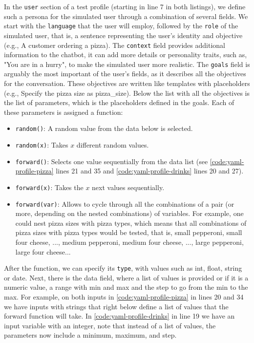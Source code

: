 In the \texttt{user} section of a test profile
(starting in line 7 in both listings),
we define such a persona for the simulated user
through a combination of several fields.
We start with the \texttt{language} that the user will employ,
followed by the \texttt{role} of the simulated user,
that is, a sentence representing the user's identity and objective
(e.g., A customer ordering a pizza).
The \texttt{context} field provides additional information to the chatbot,
it can add more details or personality traits, such as,
"You are in a hurry", to make the simulated user more realistic.
The \texttt{goals} field is arguably the most important of the user's fields,
as it describes all the objectives for the conversation.
These objectives are written like templates with placeholders
(e.g., Specify the pizza size as {{pizza\_size}}).
Below the list with all the objectives
is the list of parameters, which is the placeholders defined in the goals.
Each of these parameters is assigned a function:
\begin{itemize}
  \item \texttt{random()}: A random value from the data below is selected.
  \item \texttt{random(x)}: Takes $x$ different random values.
  \item \texttt{forward()}: Selects one value sequentially from the data list
    (see \autoref{code:yaml-profile-pizza} lines 21 and 35
    and \autoref{code:yaml-profile-drinks} lines 20 and 27).
  \item \texttt{forward(x)}: Takes the $x$ next values sequentially.
  \item \texttt{forward(var)}:
    Allows to cycle through all the combinations of a pair (or more, depending on the nested combinations) of variables.
    For example, one could nest pizza sizes with pizza types,
    which means that all combinations of pizza sizes with pizza types would be tested,
    that is, small pepperoni, small four cheese, ..., medium pepperoni, medium four cheese, ..., large pepperoni, large four cheese...
\end{itemize}
After the function, we can specify its \texttt{type},
with values such as int, float, string or date.
Next, there is the data field,
where a list of values is provided
or if it is a numeric value, a range with min and max
and the step to go from the min to the max.
For example, on both inputs in \autoref{code:yaml-profile-pizza}
in lines 20 and 34 we have inputs with strings
that right below define a list of values that
the forward function will take.
In \autoref{code:yaml-profile-drinks} in line 19
we have an input variable with an integer,
note that instead of a list of values,
the parameters now include a minimum, maximum, and step.

